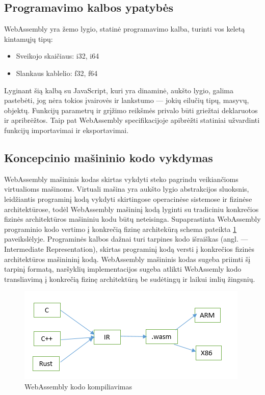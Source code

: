 \documentclass{VUMIFPSkursinis}
\begin{document}
\subsection{Programavimo kalbos ypatybės}
WebAssembly yra žemo lygio, statinė programavimo kalba, turinti vos keletą kintamųjų tipų:

\begin{itemize}
    \item Sveikojo skaičiaus: i32, i64
    \item Slankaus kablelio: f32, f64
\end{itemize}
Lyginant šią kalbą su JavaScript, kuri yra dinaminė, aukšto lygio, galima pastebėti, jog nėra tokios įvairovės ir lankstumo — jokių eilučių tipų, masyvų, objektų. Funkcijų parametrų ir grįžimo reikšmės privalo būti griežtai deklaruotos ir apribrėžtos. Taip pat WebAssembly specifikacijoje apibrėžti statiniai užvardinti funkcijų importavimai ir eksportavimai.


\subsection{Koncepcinio mašininio kodo vykdymas}
WebAssembly mašininis kodas skirtas vykdyti steko pagrindu veikiančioms virtualioms mašinoms. Virtuali mašina yra aukšto lygio abstrakcijos sluoksnis, leidžiantis programinį kodą vykdyti skirtingose operacinėse sistemose ir fizinėse architektūrose, todėl WebAssembly mašininį kodą lyginti su tradiciniu konkrečios fizinės architektūros mašininiu kodu būtų neteisinga. \cite{DAC17} Supaprastinta WebAssembly programinio kodo vertimo į konkrečią fizinę architekūrą schema pateikta \ref{fig:wasm_compilation} paveikslėlyje. Programinės kalbos dažnai turi tarpines kodo išraiškas (angl. — Intermediate Representation), skirtas programinį kodą versti į konkrečios fizinės architektūros mašinininį kodą. WebAssembly mašininis kodas sugeba priimti šį tarpinį formatą, naršyklių implementacijos sugeba atlikti WebAssemly kodo transliavimą į konkrečią fizinę architektūrą be sudėtingų ir laikui imlių žingsnių. 

\begin{figure}[h!]
  \begin{center}
  \includegraphics[scale=1]{webassembly_kompiliavimas.png}
  \end{center}
  \caption{WebAssembly kodo kompiliavimas \cite{LCW17}}
  \label{fig:wasm_compilation}
\end{figure}
\end{document}
